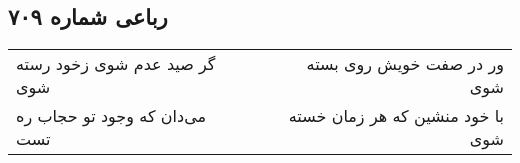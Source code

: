 \begin{center}
\section*{رباعی شماره ۷۰۹}
\label{sec:sh709}
\begin{longtable}{l p{0.5cm} r}
گر صید عدم شوی زخود رسته شوی
&&
ور در صفت خویش روی بسته شوی
\\
می‌دان که وجود تو حجاب ره تست
&&
با خود منشین که هر زمان خسته شوی
\\
\end{longtable}
\end{center}
